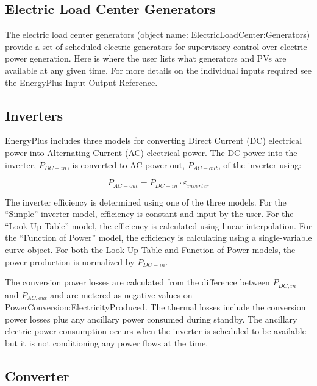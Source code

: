 \subsection{Electric Load Center Generators}\label{electric-load-center-generators}

The electric load center generators (object name: ElectricLoadCenter:Generators) provide a set of scheduled electric generators for supervisory control over electric power generation. Here is where the user lists what generators and PVs are available at any given time. For more details on the individual inputs required see the EnergyPlus Input Output Reference.

\subsection{Inverters}\label{inverters}

EnergyPlus includes three models for converting Direct Current (DC) electrical power into Alternating Current (AC) electrical power. The DC power into the inverter, \({P_{DC - in}}\), is converted to AC power out, \({P_{AC - out}}\), of the inverter using:

\begin{equation}
{P_{AC - out}} = {P_{DC - in}} \cdot {\varepsilon_{inverter}}
\end{equation}

The inverter efficiency is determined using one of the three models. For the ``Simple'' inverter model, efficiency is constant and input by the user. For the ``Look Up Table'' model, the efficiency is calculated using linear interpolation. For the ``Function of Power'' model, the efficiency is calculating using a single-variable curve object. For both the Look Up Table and Function of Power models, the power production is normalized by \({P_{DC - in}}\).

The conversion power losses are calculated from the difference between ${P_{DC,in}}$ and ${P_{AC,out}}$ and are metered as negative values on PowerConversion:ElectricityProduced.  The thermal losses include the conversion power losses plus any ancillary power consumed during standby.  The ancillary electric power consumption occurs when the inverter is scheduled to be available but it is not conditioning any power flows at the time. 

\subsection{Converter}

